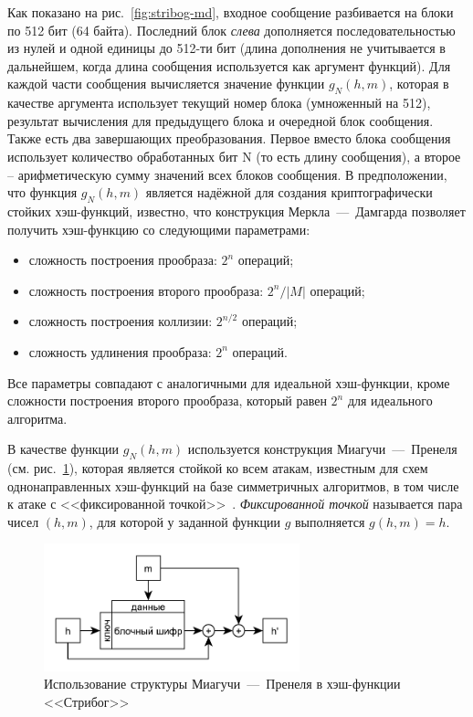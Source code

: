 Как показано на рис.~\ref{fig:stribog-md}, входное сообщение разбивается на блоки по 512 бит (64 байта). Последний блок \emph{слева} дополняется последовательностью из нулей и  одной единицы до 512-ти бит (длина дополнения не учитывается в дальнейшем, когда длина сообщения используется как аргумент функций). Для каждой части сообщения вычисляется значение функции $g_N(h, m)$, которая в качестве аргумента использует текущий номер блока (умноженный на 512), результат вычисления для предыдущего блока и очередной блок сообщения. Также есть два завершающих преобразования. Первое вместо блока сообщения использует количество обработанных бит N (то есть длину сообщения), а второе -- арифметическую сумму значений всех блоков сообщения. В предположении, что функция $g_N(h, m)$ является надёжной для создания криптографически стойких хэш-функций, известно, что конструкция Меркла~---~Дамгарда позволяет получить хэш-функцию со следующими параметрами:

\begin{itemize}
	\item сложность построения прообраза: $2^n$ операций;
	\item сложность построения второго прообраза: $2^n / \left|M\right|$ операций;
	\item сложность построения коллизии: $2^{n/2}$ операций;
	\item сложность удлинения прообраза: $2^n$ операций.
\end{itemize}

Все параметры совпадают с аналогичными для идеальной хэш-функции, кроме сложности построения второго прообраза, который равен $2^n$ для идеального алгоритма.

В качестве функции $g_N(h, m)$ используется конструкция Миагучи~---~Пренеля (см. рис.~\ref{fig:stribog-mp}), которая является стойкой ко всем атакам, известным для схем однонаправленных хэш-функций на базе симметричных алгоритмов, в том числе к атаке с <<фиксированной точкой>>~\cite[стр. 502]{Schneier:2002}. \emph{Фиксированной точкой} называется пара чисел $(h, m)$, для которой у заданной функции $g$ выполняется $g(h, m) = h$.

\begin{figure}[htb]
	\centering
	\includegraphics[width=0.66\textwidth]{pic/stribog-mp}
  \caption{Использование структуры Миагучи~---~Пренеля в хэш-функции <<Стрибог>>}
  \label{fig:stribog-mp}
\end{figure}

